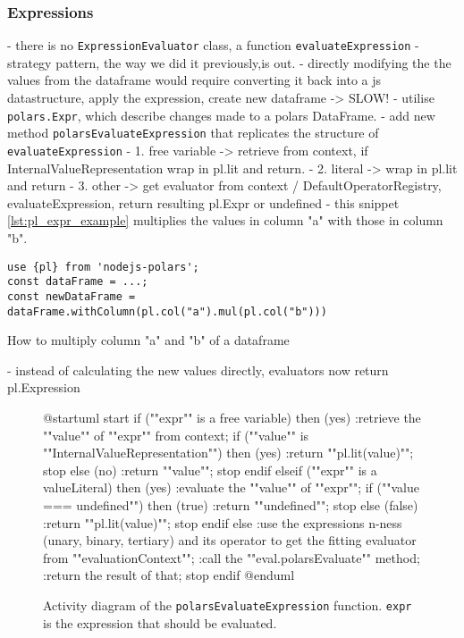 \subsubsection{Expressions}
- there is no \Verb|ExpressionEvaluator| class, a function \Verb|evaluateExpression|
- strategy pattern, the way we did it previously,is out.
- directly modifying the the values from the dataframe would require converting it back into a js datastructure, apply the expression, create new dataframe -> SLOW!
- utilise \Verb|polars.Expr|, which describe changes made to a polars DataFrame.
- add new method \Verb|polarsEvaluateExpression| that replicates the structure of \Verb|evaluateExpression|
- 1. free variable -> retrieve from context, if InternalValueRepresentation wrap in pl.lit and return.
- 2. literal -> wrap in pl.lit and return
- 3. other -> get evaluator from context / DefaultOperatorRegistry, evaluateExpression, return resulting pl.Expr or undefined
- this snippet \ref{lst:pl_expr_example} multiplies the values in column "a" with those in column "b".
\begin{listing}
	\begin{verbatim}
use {pl} from 'nodejs-polars';
const dataFrame = ...;
const newDataFrame = dataFrame.withColumn(pl.col("a").mul(pl.col("b")))
	\end{verbatim}
	\caption{How to multiply column "a" and "b" of a dataframe}
	\label{lst:pl_expr_example}
\end{listing}
- instead of calculating the new values directly, evaluators now return pl.Expression

\begin{figure}
	\begin{plantuml}
		@startuml
		start
		if (""expr"" is a free variable) then (yes)
		:retrieve the ""value"" of ""expr"" from context;
		if (""value"" is ""InternalValueRepresentation"") then (yes)
		:return ""pl.lit(value)"";
		stop
		else (no)
		:return ""value"";
		stop
		endif
		elseif (""expr"" is a valueLiteral) then (yes)
		:evaluate the ""value"" of ""expr"";
		if (""value === undefined"") then (true)
		:return ""undefined"";
		stop
		else (false)
		:return ""pl.lit(value)"";
		stop
		endif
		else
		:use the expressions n-ness (unary, binary, tertiary) and its
		operator to get the fitting evaluator from ""evaluationContext"";
		:call the ""eval.polarsEvaluate"" method;
		:return the result of that;
		stop
		endif
		@enduml
	\end{plantuml}
	\caption{
		Activity diagram of the \Verb|polarsEvaluateExpression| function.
		\Verb|expr| is the expression that should be evaluated. %
	}
	\label{fig:uml:polars_evaluate_expression}
\end{figure}


